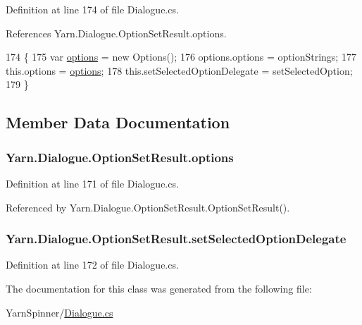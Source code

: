 Definition at line 174 of file Dialogue.\-cs.



References Yarn.\-Dialogue.\-Option\-Set\-Result.\-options.


\begin{DoxyCode}
174                                                                                                   \{
175                 var \hyperlink{a00147_abda9c3047ff9d3c3ec5540566a239315}{options} = \textcolor{keyword}{new} Options();
176                 options.options = optionStrings;
177                 this.options = \hyperlink{a00147_abda9c3047ff9d3c3ec5540566a239315}{options};
178                 this.setSelectedOptionDelegate = setSelectedOption;
179             \}
\end{DoxyCode}


\subsection{Member Data Documentation}
\hypertarget{a00147_abda9c3047ff9d3c3ec5540566a239315}{
\subsubsection[{options}]{ Yarn.\-Dialogue.\-Option\-Set\-Result.\-options}}\label{a00147_abda9c3047ff9d3c3ec5540566a239315}


Definition at line 171 of file Dialogue.\-cs.



Referenced by Yarn.\-Dialogue.\-Option\-Set\-Result.\-Option\-Set\-Result().

\hypertarget{a00147_a6f2683598cf0f62b76bb864640cc79dd}{
\subsubsection[{set\-Selected\-Option\-Delegate}]{ Yarn.\-Dialogue.\-Option\-Set\-Result.\-set\-Selected\-Option\-Delegate}}\label{a00147_a6f2683598cf0f62b76bb864640cc79dd}


Definition at line 172 of file Dialogue.\-cs.



The documentation for this class was generated from the following file\-:\begin{DoxyCompactItemize}
\item 
Yarn\-Spinner/\hyperlink{a00308}{Dialogue.\-cs}\end{DoxyCompactItemize}
